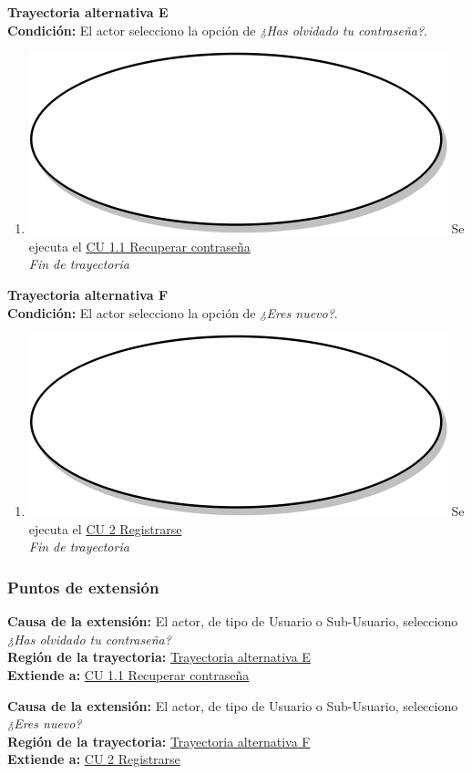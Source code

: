 \textbf{Trayectoria alternativa E} \label{cu1_ta_e}\\
\textbf{Condición:} El actor selecciono la opción de \textit{¿Has olvidado tu contraseña?}.\\
 \begin{enumerate}[label=E\arabic*]
    \item {\includegraphics[scale=.05]{Capitulo3/img/proceso.png} Se ejecuta el \hyperref[cu1_1]{CU 1.1 Recuperar contraseña}} \\
    \textit{Fin de trayectoria} \\
\end{enumerate}

\textbf{Trayectoria alternativa F} \label{cu1_ta_f}\\
\textbf{Condición:} El actor selecciono la opción de \textit{¿Eres nuevo?}.\\
 \begin{enumerate}[label=F\arabic*]
    \item {\includegraphics[scale=.05]{Capitulo3/img/proceso.png} Se ejecuta el \hyperref[cu2]{CU 2 Registrarse}} \\
    \textit{Fin de trayectoria} \\
\end{enumerate}

\subsubsection{Puntos de extensión}
\noindent \textbf{Causa de la extensión:} El actor, de tipo de Usuario o Sub-Usuario, selecciono \textit{¿Has olvidado tu contraseña?} \\
\textbf{Región de la trayectoria:} \hyperref[cu1_ta_e]{Trayectoria alternativa E} \\
\textbf{Extiende a:} \hyperref[cu1_1]{CU 1.1 Recuperar contraseña} \\ \par

\noindent \textbf{Causa de la extensión:} El actor, de tipo de Usuario o Sub-Usuario, selecciono \textit{¿Eres nuevo?} \\
\textbf{Región de la trayectoria:} \hyperref[cu1_ta_f]{Trayectoria alternativa F} \\
\textbf{Extiende a:} \hyperref[cu2]{CU 2 Registrarse}

